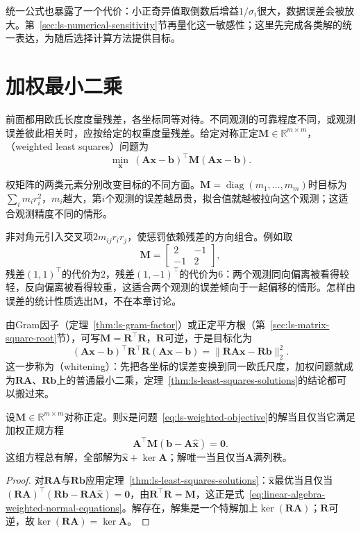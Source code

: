 统一公式也暴露了一个代价：小正奇异值取倒数后增益$1/\sigma_i$很大，数据误差会被放大。第~\ref{sec:ls-numerical-sensitivity}节再量化这一敏感性；这里先完成各类解的统一表达，为随后选择计算方法提供目标。

\section{加权最小二乘}
\label{sec:ls-weighted-ls}

前面都用欧氏长度度量残差，各坐标同等对待。不同观测的可靠程度不同，或观测误差彼此相关时，应按给定的权重度量残差。给定对称正定$\bm M\in\mathbb R^{m\times m}$，（weighted least squares）问题为
\begin{equation}
 \min_{\bm x}\ (\bm A\bm x-\bm b)^\top\bm M(\bm A\bm x-\bm b).
 \label{eq:ls-weighted-objective}
\end{equation}

权矩阵的两类元素分别改变目标的不同方面。$\bm M=\operatorname{diag}(m_1,\ldots,m_m)$时目标为$\sum_im_ir_i^2$，$m_i$越大，第$i$个观测的误差越昂贵，拟合值就越被拉向这个观测；这适合观测精度不同的情形。

非对角元引入交叉项$2m_{ij}r_ir_j$，使惩罚依赖残差的方向组合。例如取
\[
 \bm M=\begin{bmatrix}2&-1\\-1&2\end{bmatrix},
\]
残差$(1,1)^\top$的代价为$2$，残差$(1,-1)^\top$的代价为$6$：两个观测同向偏离被看得较轻，反向偏离被看得较重，这适合两个观测的误差倾向于一起偏移的情形。怎样由误差的统计性质选出$\bm M$，不在本章讨论。

由Gram因子（定理~\ref{thm:ls-gram-factor}）或正定平方根（第~\ref{sec:ls-matrix-square-root}节），可写$\bm M=\bm R^\top\bm R$，$\bm R$可逆，于是目标化为
\[
 (\bm A\bm x-\bm b)^\top\bm R^\top\bm R(\bm A\bm x-\bm b)=\lVert\bm R\bm A\bm x-\bm R\bm b\rVert_2^2 .
\]
这一步称为（whitening）：先把各坐标的误差变换到同一欧氏尺度，加权问题就成为$\bm R\bm A$、$\bm R\bm b$上的普通最小二乘，定理~\ref{thm:ls-least-squares-solutions}的结论都可以搬过来。

\begin{theorem}[加权最小二乘解的刻画]
\label{thm:ls-weighted-least-squares}
设$\bm M\in\mathbb R^{m\times m}$对称正定。则$\hat{\bm x}$是问题~\eqref{eq:ls-weighted-objective}的解当且仅当它满足加权正规方程
\begin{equation}
 \bm A^\top\bm M(\bm b-\bm A\hat{\bm x})=\bm0 .
 \label{eq:linear-algebra-weighted-normal-equations}
\end{equation}
这组方程总有解，全部解为$\hat{\bm x}+\ker\bm A$；解唯一当且仅当$\bm A$满列秩。
\end{theorem}
\begin{proof}
对$\bm R\bm A$与$\bm R\bm b$应用定理~\ref{thm:ls-least-squares-solutions}：$\hat{\bm x}$最优当且仅当$(\bm R\bm A)^\top(\bm R\bm b-\bm R\bm A\hat{\bm x})=\bm0$，由$\bm R^\top\bm R=\bm M$，这正是式~\eqref{eq:linear-algebra-weighted-normal-equations}。解存在，解集是一个特解加上$\ker(\bm R\bm A)$；$\bm R$可逆，故$\ker(\bm R\bm A)=\ker\bm A$。
\end{proof}

